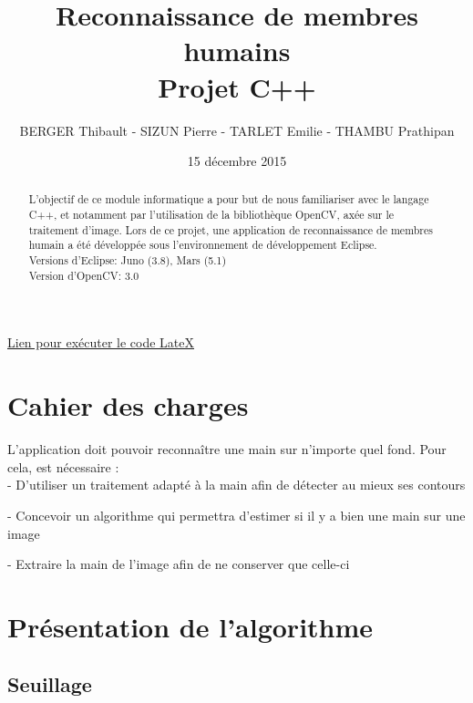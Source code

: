 \documentclass[10pt,a4paper]{report}
\begin{document}
\title{Reconnaissance de membres humains\\
Projet C++}
\author{BERGER Thibault - SIZUN Pierre - TARLET Emilie - THAMBU Prathipan}
\date{15 d\'ecembre 2015}
\href{https://www.overleaf.com/3918882mrfmjh#/11323738/}{Lien pour exécuter le code LateX}
\maketitle

\begin{abstract}
L'objectif de ce module informatique a pour but de nous familiariser avec le langage C++, et notamment par l'utilisation de la bibliothèque OpenCV, axée sur le traitement d'image.
Lors de ce projet, une application de reconnaissance de membres humain a été développée sous l'environnement de développement Eclipse.\\
\newline
Versions d'Eclipse: Juno (3.8), Mars (5.1)\\
Version d'OpenCV: 3.0
\end{abstract}

\tableofcontents
\newpage


\section{Cahier des charges}

L'application doit pouvoir reconnaître une main sur n’importe quel fond.  Pour cela, est nécessaire :\\

	- D'utiliser un traitement adapté à la main afin de détecter au mieux ses contours
	
	- Concevoir un algorithme qui permettra d’estimer si il y a bien une main sur une image 
	
	- Extraire la main de l’image afin de ne conserver que celle-ci


\section{Présentation de l'algorithme}
\subsection{Seuillage}
\end{document}
